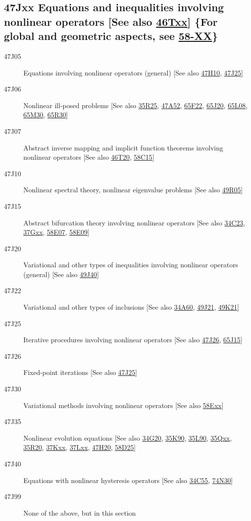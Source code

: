 \documentclass[letterpaper]{article}
\begin{document}
\subsection*{47Jxx  Equations and inequalities involving nonlinear operators [See also \hyperref[46Txx]{46Txx}] \{For global and geometric aspects, see \hyperref[58-XX]{58-XX}\} }\label{47Jxx}
\begin{description}  
\item [47J05]\label{47J05} Equations involving nonlinear operators (general) [See also \hyperref[47H10]{47H10}, \hyperref[47J25]{47J25}]
\item [47J06]\label{47J06} Nonlinear ill-posed problems [See also \hyperref[35R25]{35R25}, \hyperref[47A52]{47A52}, \hyperref[65F22]{65F22}, \hyperref[65J20]{65J20}, \hyperref[65L08]{65L08}, \hyperref[65M30]{65M30}, \hyperref[65R30]{65R30}]
\item [47J07]\label{47J07} Abstract inverse mapping and implicit function theorems involving nonlinear operators [See also \hyperref[46T20]{46T20}, \hyperref[58C15]{58C15}]
\item [47J10]\label{47J10} Nonlinear spectral theory, nonlinear eigenvalue problems [See also \hyperref[49R05]{49R05}]
\item [47J15]\label{47J15} Abstract bifurcation theory involving nonlinear operators [See also \hyperref[34C23]{34C23}, \hyperref[37Gxx]{37Gxx}, \hyperref[58E07]{58E07}, \hyperref[58E09]{58E09}]
\item [47J20]\label{47J20} Variational and other types of inequalities involving nonlinear operators (general) [See also \hyperref[49J40]{49J40}]
\item [47J22]\label{47J22} Variational and other types of inclusions [See also \hyperref[34A60]{34A60}, \hyperref[49J21]{49J21}, \hyperref[49K21]{49K21}]
\item [47J25]\label{47J25} Iterative procedures involving nonlinear operators [See also \hyperref[47J26]{47J26}, \hyperref[65J15]{65J15}]
\item [47J26]\label{47J26} Fixed-point iterations [See also \hyperref[47J25]{47J25}]
\item [47J30]\label{47J30} Variational methods involving nonlinear operators [See also \hyperref[58Exx]{58Exx}]
\item [47J35]\label{47J35} Nonlinear evolution equations [See also \hyperref[34G20]{34G20}, \hyperref[35K90]{35K90}, \hyperref[35L90]{35L90}, \hyperref[35Qxx]{35Qxx}, \hyperref[35R20]{35R20}, \hyperref[37Kxx]{37Kxx}, \hyperref[37Lxx]{37Lxx}, \hyperref[47H20]{47H20}, \hyperref[58D25]{58D25}]
\item [47J40]\label{47J40} Equations with nonlinear hysteresis operators [See also \hyperref[34C55]{34C55}, \hyperref[74N30]{74N30}]
\item [47J99]\label{47J99} None of the above, but in this section
\end{description}
\end{document}
